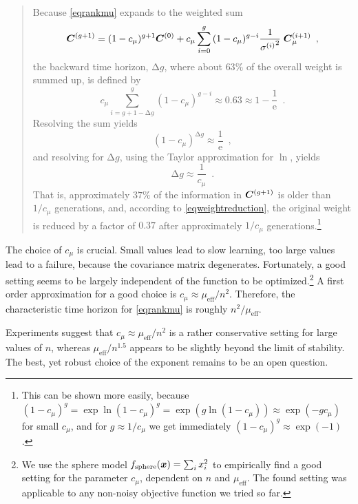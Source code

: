\documentclass{article} %
\newenvironment{einschub}{%
\begin{small} \begin{quotation}\noindent}{%
  \vspace{0.5ex}\end{quotation}\end{small}%
}
\newcommand{\kom}[1]{}
\newcommand{\ve}[1]{\mathchoice{\mbox{\boldmath$\displaystyle#1$}}
  {\mbox{\boldmath$\textstyle#1$}} {\mbox{\boldmath$\scriptstyle#1$}}
  {\mbox{\boldmath$\scriptscriptstyle#1$}}}
\newcommand{\ma}[1]{\mathchoice{\mbox{\boldmath$\displaystyle#1$}}
  {\mbox{\boldmath$\textstyle#1$}} {\mbox{\boldmath$\scriptstyle#1$}}
  {\mbox{\boldmath$\scriptscriptstyle#1$}}}
\newcommand{\fsphere}{f_{\mathrm{sphere}}}
\newcommand{\N}{\ensuremath{n}}
\newcommand{\mueff}{\ensuremath{\mu_\mathrm{eff}}}
\newcommand{\suml}[2]{\sum_{#1=0}^{#2}}
\newcommand{\sig}{\ensuremath{\sigma}}
\newcommand{\Cgg}{\ma{C}^{(g+1)}}
\newcommand{\Cii}{\ma{C}^{(i+1)}}
\newcommand{\cmu}{\ensuremath{c_\mu}}
\newcommand{\rmDelta}{\mathrm{\Delta}}
\begin{document}
\begin{einschub}%
  Because \eqref{eqrankmu} expands to the weighted sum
  \begin{equation}
  \Cgg = (1-\cmu)^{g+1}\ma{C}^{(0)} + 
     \cmu\suml{i}{g}{(1-\cmu)^{g-i}}
     \frac{1}{{\sig^{(i)}}^2}\;\Cii_\mu \enspace,
  \end{equation}
  the backward time horizon, $\rmDelta g$, where about $63\%$ of the
  overall weight is summed up, is defined by
  \begin{equation}
  \cmu\sum_{i=g+1-\rmDelta g}^{g}{(1-\cmu)^{g-i}} \approx 0.63 \approx 1 -
  \frac{1}{\mathrm{e}} \enspace.
  \end{equation}
Resolving the sum yields
{\begin{equation}\label{eqweightreduction}
  (1-\cmu)^{\rmDelta g} \approx \frac{1}{\mathrm{e}} \enspace,
\end{equation}
%
and resolving for $\rmDelta g$, using the Taylor approximation for
$\ln$, yields
\begin{equation}\label{eqcovtime}
   \rmDelta g\approx\frac{1}{\cmu} \enspace.
\end{equation}
}%
That is, approximately $37\%$ of the information in $\Cgg$ is older
than ${1}/{\cmu}$ generations, and, according to
\eqref{eqweightreduction}, the original weight is reduced by a factor
of $0.37\kom{\approx\frac{1}{2.7} \approx\frac{1}{e}}$ after
approximately ${1}/{\cmu}$ generations.\footnote{%
%
   This can be shown more easily, because $(1-\cmu)^g =
   \exp\ln(1-\cmu)^g = \exp(g\ln(1-\cmu)) \approx \exp(-g\cmu)$ for
   small $\cmu$, and for $g\approx 1/\cmu$ we get immediately
   $(1-\cmu)^g\approx\exp(-1)$.}
%

\end{einschub}
%
The choice of $\cmu$ is crucial. Small values lead to slow
learning, too large values lead to a failure, because the covariance
matrix degenerates. Fortunately, a good setting seems to be largely
independent of the function to be optimized.\footnote{%
%
  We use the sphere model $\fsphere(\ve{x})=\sum_i x_i^2$ to
  empirically find a good setting for the parameter $\cmu$, dependent
  on $\N$ and $\mueff$.  The found setting was applicable to any
  non-noisy objective function we tried so far. }
% 
A first order approximation for a good choice is
$\cmu\approx{\mueff}/{\N^2}$.  Therefore, the characteristic time
horizon for \eqref{eqrankmu} is roughly ${\N^2}/{\mueff}$. 

Experiments 
suggest that $\cmu\approx\mueff/\N^2$ is a rather conservative setting for large values of \N, 
whereas $\mueff/\N^{1.5}$ appears to be slightly beyond the limit of  
stability. The best, yet robust choice of the exponent remains to 
be an open question. 
\end{document}
